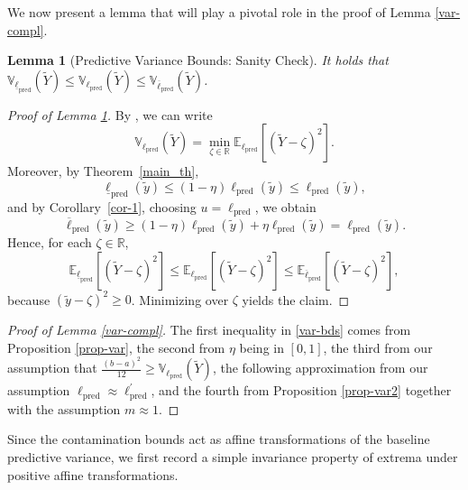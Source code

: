 \documentclass[12pt, english, oneside, a4paper]{article}
\newtheorem{lemma}[theorem]{Lemma}
\begin{document}
We now present a lemma that will play a pivotal role in the proof of Lemma \ref{var-compl}.

\begin{lemma}[Predictive Variance Bounds: Sanity Check]\label{sanity}
    It holds that $\mathbb{V}_{\underline{\ell}_\text{pred}}(\tilde{Y}) \leq \mathbb{V}_{{\ell}_\text{pred}}(\tilde{Y}) \leq \mathbb{V}_{\overline{\ell}_\text{pred}}(\tilde{Y})$.
\end{lemma}






\begin{proof}[Proof of Lemma \ref{sanity}]
By \citet[Appendix G]{walley}, we can write
\[
\mathbb{V}_{{\ell}_\text{pred}}(\tilde{Y})=\min_{\zeta\in\mathbb{R}} \mathbb{E}_{{\ell}_\text{pred}}[(\tilde{Y}-\zeta)^2].
\]
Moreover, by Theorem~\ref{main_th},
\[
\underline{\ell}_\text{pred}(\tilde y)\le (1-\eta)\ell_\text{pred}(\tilde y)\le \ell_\text{pred}(\tilde y),
\]
and by Corollary~\ref{cor-1}, choosing $u=\ell_\text{pred}$, we obtain
\[
\overline{\ell}_\text{pred}(\tilde y)\ge (1-\eta)\ell_\text{pred}(\tilde y)+\eta \ell_\text{pred}(\tilde y)=\ell_\text{pred}(\tilde y).
\]
Hence, for each $\zeta\in\mathbb{R}$,
\[
\mathbb{E}_{\underline{\ell}_\text{pred}}[(\tilde{Y}-\zeta)^2]\le
\mathbb{E}_{{\ell}_\text{pred}}[(\tilde{Y}-\zeta)^2]\le
\mathbb{E}_{\overline{\ell}_\text{pred}}[(\tilde{Y}-\zeta)^2],
\]
because $(\tilde y-\zeta)^2\ge 0$. Minimizing over $\zeta$ yields the claim.
\end{proof}


\begin{proof}[Proof of Lemma \ref{var-compl}]
    The first inequality in \eqref{var-bds} comes from Proposition \ref{prop-var}, the second from $\eta$ being in $[0,1]$, the third from our assumption that $\frac{(b-a)^2}{12} \geq \mathbb{V}_{{\ell}_\text{pred}}(\tilde{Y})$, the following approximation from our assumption ${\ell}_\text{pred} \approx {\ell}_\text{pred}^\prime$,
and the fourth from Proposition \ref{prop-var2} together with the assumption $m \approx 1$.
\end{proof}

Since the contamination bounds act as affine transformations of the baseline predictive variance, we first record a simple invariance property of extrema under positive affine transformations.
\end{document}
